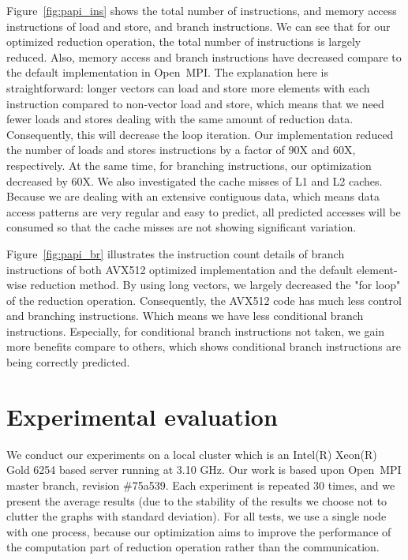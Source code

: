 \documentclass[sigconf]{acmart}
\newcommand{\ompi}[0]{Open~MPI\xspace}
\begin{document}
Figure~\ref{fig:papi_ins} shows the total number of instructions, and memory access instructions of
load and store, and branch instructions.
We can see that for our optimized reduction operation, the total number of
instructions is largely reduced. Also, memory access and branch instructions
have decreased compare to the default implementation in \ompi.
The explanation here is straightforward: longer vectors can load and
store more elements with each instruction compared to non-vector load
and store, which means that we need fewer loads and stores dealing
with the same amount of reduction data.  Consequently, this will
decrease the loop iteration.
%
Our implementation reduced the number of loads and stores instructions
by a factor of 90X and 60X, respectively.  At the same time, for
branching instructions, our optimization decreased by 60X.  We also
investigated the cache misses of L1 and L2 caches. Because we are
dealing with an extensive contiguous data, which means data access
patterns are very regular and easy to predict, all predicted accesses
will be consumed so that the cache misses are not showing significant
variation.

Figure~\ref{fig:papi_br} illustrates the instruction count details
of branch instructions of both AVX512 optimized implementation and the default
element-wise reduction method. By using long vectors, we largely decreased the "for loop" of the reduction
operation. Consequently, the AVX512 code has much less control and branching instructions.
Which means we have less conditional branch instructions.
Especially, for conditional branch instructions not taken, we gain
more benefits compare to others, which shows conditional branch instructions are being correctly predicted.


\section{Experimental evaluation}\label{sec:experiments}
We conduct our experiments on a local cluster which is an Intel(R)
Xeon(R) Gold 6254 based server running at 3.10 GHz. Our work is based
upon \ompi master branch, revision \#75a539. Each experiment is
repeated 30 times, and we present the average results (due to the
stability of the results we choose not to clutter the graphs with
standard deviation). For all tests, we use a single node with one
process, because our optimization aims to improve the performance of
the computation part of reduction operation rather than the
communication.
\end{document}
